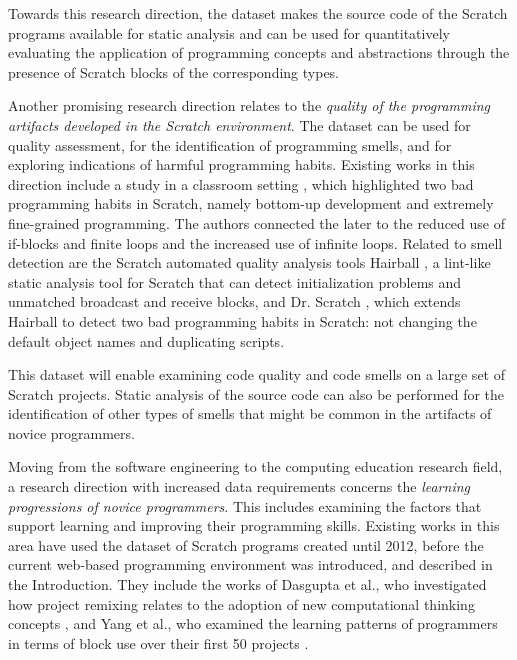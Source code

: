 \documentclass[10pt, conference]{IEEEtran}
\begin{document}
Towards this research direction, the dataset makes the source code of the Scratch programs available for static analysis and can be used for quantitatively evaluating the application of programming concepts and abstractions through the presence of Scratch blocks of the corresponding types.

Another promising research direction relates to the \textit{quality of the programming artifacts developed in the Scratch environment}.
The dataset can be used for quality assessment, for the identification of programming smells, and for exploring indications of harmful programming habits.
Existing works in this direction include a study in a classroom setting \cite{Meerbaum_habits_2011}, which highlighted two bad programming habits in Scratch, namely bottom-up development and extremely fine-grained programming.
The authors connected the later to the reduced use of if-blocks and finite loops and the increased use of infinite loops.
Related to smell detection are the Scratch automated quality analysis tools Hairball \cite{boe_hairball:_2013}, a lint-like static analysis tool for Scratch that can detect initialization problems and unmatched broadcast and receive blocks, and Dr. Scratch \cite{moreno-leon_dr._2015}, which extends Hairball to detect two bad programming habits in Scratch: not changing the default object names and duplicating scripts.

This dataset will enable examining code quality and code smells on a large set of Scratch projects.
Static analysis of the source code can also be performed for the identification of other types of smells \cite{fowler_refactoring:_1999} that might be common in the artifacts of novice programmers.

Moving from the software engineering to the computing education research field, a research direction with increased data requirements concerns the \textit{learning progressions of novice programmers}.
This includes examining the factors that support learning and improving their programming skills.
Existing works in this area have used the dataset of Scratch programs created until 2012, before the current web-based programming environment was introduced, and described in the Introduction.
They include the works of Dasgupta et al., who investigated how project remixing relates to the adoption of new computational thinking concepts \cite{Dasgupta_2016}, and Yang et al., who examined the learning patterns of programmers in terms of block use over their first 50 projects \cite{yang_2015}.
\end{document}
